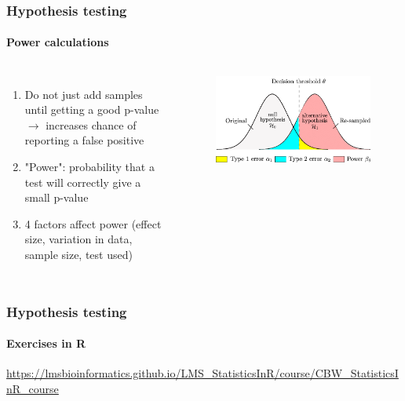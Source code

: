 \documentclass[aspectratio=43]{beamer}
\begin{document}
\begin{frame}
	
	\frametitle{Hypothesis testing}
	\framesubtitle{Power calculations}
	
	\footnotesize
	
	\begin{columns}
		
		
		\begin{enumerate}
			\item Do not just add samples until getting a good p-value $\rightarrow$ increases chance of reporting a false positive
			\item "Power": probability that a test will {\color{blue}correctly} give a small p-value
			\item 4 factors affect power (effect size, variation in data, sample size, test used)
		\end{enumerate}
		
		
		\begin{figure}[!htb]
			\includegraphics[width = \linewidth]{plots/part3/hypothesis.png}
		\end{figure}
		
	\end{columns}

\end{frame}

\begin{frame}
	
	\frametitle{Hypothesis testing}
	\framesubtitle{Exercises in R}
	
	\footnotesize
	
	\href{https://lmsbioinformatics.github.io/LMS_StatisticsInR/course/CBW_StatisticsInR_course.html\#/54}{https://lmsbioinformatics.github.io/LMS\_StatisticsInR/course/CBW\_StatisticsInR\_course}

\end{frame}
\end{document}
